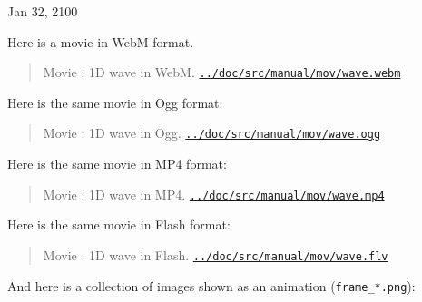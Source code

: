 \documentclass[%
oneside,                 %
final,                   %
10pt]{article}
\newenvironment{doconce:movie}{}{}
\newcounter{doconce:movie:counter}
\begin{document}
\begin{center}
Jan 32, 2100
\end{center}
\vspace{1cm}
Here is a movie in WebM format.
\begin{doconce:movie}
\begin{quote}
Movie : 1D wave in WebM. \href{run:../doc/src/manual/mov/wave.webm}{\nolinkurl{../doc/src/manual/mov/wave.webm}}
\end{quote}
\end{doconce:movie}
Here is the same movie in Ogg format:
\begin{doconce:movie}
\begin{quote}
Movie : 1D wave in Ogg. \href{run:../doc/src/manual/mov/wave.ogg}{\nolinkurl{../doc/src/manual/mov/wave.ogg}}
\end{quote}
\end{doconce:movie}
Here is the same movie in MP4 format:
\begin{doconce:movie}
\begin{quote}
Movie : 1D wave in MP4. \href{run:../doc/src/manual/mov/wave.mp4}{\nolinkurl{../doc/src/manual/mov/wave.mp4}}
\end{quote}
\end{doconce:movie}
Here is the same movie in Flash format:
\begin{doconce:movie}
\begin{quote}
Movie : 1D wave in Flash. \href{run:../doc/src/manual/mov/wave.flv}{\nolinkurl{../doc/src/manual/mov/wave.flv}}
\end{quote}
\end{doconce:movie}
And here is a collection of images shown as an animation
(\Verb!frame_*.png!):
\end{document}
